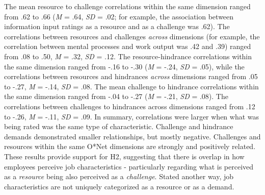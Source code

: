 \documentclass[
  english,
  man]{apa6}
\begin{document}
The mean resource to challenge correlations within the same dimension ranged from .62 to .66 (\emph{M} = .64, \emph{SD} = .02; for example, the association between information input ratings as a resource and as a challenge was .62). The correlations between resources and challenges \emph{across} dimensions (for example, the correlation between mental processes and work output was .42 and .39) ranged from .08 to .50, \emph{M} = .32, \emph{SD} = .12. The resource-hindrance correlations within the same dimension ranged from -.16 to -.30 (\emph{M} = -.24, \emph{SD} = .05), while the correlations between resources and hindrances \emph{across} dimensions ranged from .05 to -.27, \emph{M} = -.14, \emph{SD} = .08. The mean challenge to hindrance correlations within the same dimension ranged from -.04 to -.27 (\emph{M} = -.21, \emph{SD} = .08). The correlations between challenges to hindrances across dimensions ranged from .12 to -.26, \emph{M} = -.11, \emph{SD} = .09. In summary, correlations were larger when what was being rated was the same type of characteristic. Challenge and hindrance demands demonstrated smaller relationships, but mostly negative. Challenges and resources within the same O*Net dimensions are strongly and positively related. These results provide support for H2, suggesting that there is overlap in how employees perceive job characteristics - particularly regarding what is perceived as a \emph{resource} being also perceived as a \emph{challenge}. Stated another way, job characteristics are not uniquely categorized as a resource or as a demand.
\end{document}
